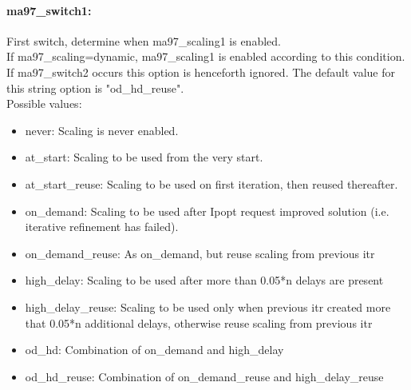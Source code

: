 \paragraph{ma97\_switch1:}\label{opt:ma97_switch1} First switch, determine when ma97\_scaling1 is enabled. \\
 If ma97\_scaling=dynamic, ma97\_scaling1 is enabled according to this condition. If ma97\_switch2 occurs this option is henceforth ignored. The default value for this string option is "od\_hd\_reuse".
\\ 
Possible values:
\begin{itemize}
   \item never: Scaling is never enabled.
   \item at\_start: Scaling to be used from the very start.
   \item at\_start\_reuse: Scaling to be used on first iteration, then reused thereafter.
   \item on\_demand: Scaling to be used after Ipopt request improved solution (i.e. iterative refinement has failed).
   \item on\_demand\_reuse: As on\_demand, but reuse scaling from previous itr
   \item high\_delay: Scaling to be used after more than 0.05*n delays are present
   \item high\_delay\_reuse: Scaling to be used only when previous itr created more that 0.05*n additional delays, otherwise reuse scaling from previous itr
   \item od\_hd: Combination of on\_demand and high\_delay
   \item od\_hd\_reuse: Combination of on\_demand\_reuse and high\_delay\_reuse
\end{itemize}

